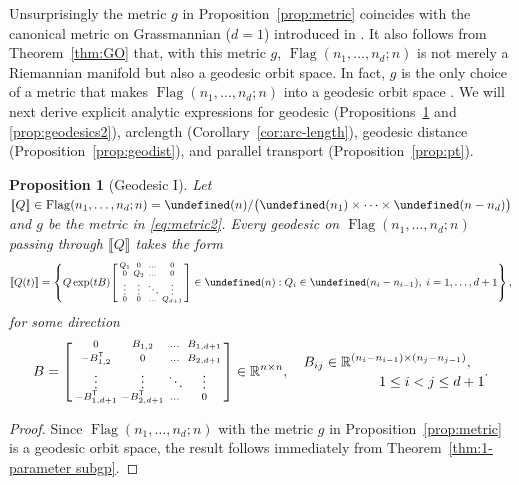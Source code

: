 \documentclass[11pt,reqno]{amsart}%
\newtheorem{proposition}[theorem]{Proposition}
\theoremstyle{definition}
\theoremstyle{remark}
\newcommand{\tp}{{\scriptscriptstyle\mathsf{T}}}
\newcommand{\lb}{\llbracket}
\newcommand{\rb}{\rrbracket}
\let\O\undefined
\DeclareMathOperator{\Flag}{Flag}
\DeclareMathOperator{\O}{O}
\begin{document}
Unsurprisingly  the metric $g$ in  Proposition~\ref{prop:metric} coincides with the canonical metric on Grassmannian  ($d= 1$) introduced in \cite{EAS}. It also follows from Theorem~\ref{thm:GO} that,  with this metric $g$, $\Flag(n_1,\dots, n_d;n)$ is not merely a Riemannian manifold but also a geodesic orbit space. In fact, $g$ is the only choice of a metric that makes $\Flag(n_1,\dots,n_d;n)$ into a geodesic orbit space \cite{AA2007}. We will next derive explicit analytic expressions for geodesic (Propositions~\ref{prop:geodesics1} and \ref{prop:geodesics2}), arclength (Corollary~\ref{cor:arc-length}), geodesic distance (Proposition~\ref{prop:geodist}), and parallel transport (Proposition~\ref{prop:pt}).
\begin{proposition}[Geodesic I]\label{prop:geodesics1}
Let $\lb Q \rb \in \Flag(n_1,\dots, n_d;n) = \O(n)/\bigl(\O(n_1)\times \dots \times \O(n-n_d)\bigr)$ and $g$ be the metric in \eqref{eq:metric2}. Every geodesic on  $\Flag(n_1,\dots, n_d;n)$ passing through $\lb Q \rb$ takes the form 
\[
\lb Q(t) \rb = \left\lbrace Q\exp (tB) \begin{bsmallmatrix}
Q_1 & 0 & \dots & 0\\
0 & Q_2 & \dots & 0\\
\vdots & \vdots & \ddots & \vdots \\
0 & 0 & \dots & Q_{d+1}
\end{bsmallmatrix}  \in \O(n): Q_i \in \O(n_i- n_{i-1}),\; i=1,\dots, d+1
\right\rbrace,
\]
for some direction
\begin{equation}\label{eq:exp map direction}
B = \begin{bsmallmatrix}
0 & B_{1,2}  &\dots & B_{1,d+1} \\
-B_{1,2}^\tp  & 0   &\dots & B_{2,d+1} \\
\vdots & \vdots & \ddots & \vdots\\
-B_{1,d+1}^\tp  & -B_{2,d+1}^\tp  & \dots & 0
\end{bsmallmatrix} \in \mathbb{R}^{n \times n}, \quad \begin{multlined} B_{ij}\in \mathbb{R}^{(n_i-n_{i-1}) \times (n_j-n_{j-1})}, \\ 1\le i < j \le d+1\end{multlined}.
\end{equation}
\end{proposition}
\begin{proof}
Since $\Flag(n_1,\dots, n_d;n)$ with the metric $g$ in  Proposition~\ref{prop:metric} is a geodesic orbit space, the result follows immediately from Theorem~\ref{thm:1-parameter subgp}.
\end{proof}
\end{document}
